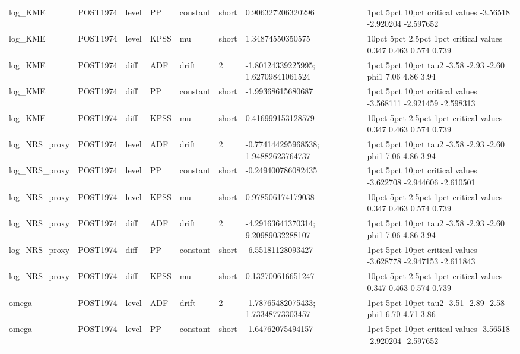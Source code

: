 \begin{tabular}{llllllll}
log\_KME & POST1974 & level & PP & constant & short & 0.906327206320296 &                     1pct      5pct     10pct critical values -3.56518 -2.920204 -2.597652 \\
log\_KME & POST1974 & level & KPSS & mu & short & 1.34874550350575 &                 10pct  5pct 2.5pct  1pct critical values 0.347 0.463  0.574 0.739 \\
log\_KME & POST1974 & diff & ADF & drift & 2 & -1.80124339225995; 1.62709841061524 &       1pct  5pct 10pct tau2 -3.58 -2.93 -2.60 phi1  7.06  4.86  3.94 \\
log\_KME & POST1974 & diff & PP & constant & short & -1.99368615680687 &                      1pct      5pct     10pct critical values -3.568111 -2.921459 -2.598313 \\
log\_KME & POST1974 & diff & KPSS & mu & short & 0.416999153128579 &                 10pct  5pct 2.5pct  1pct critical values 0.347 0.463  0.574 0.739 \\
log\_NRS\_proxy & POST1974 & level & ADF & drift & 2 & -0.774144295968538; 1.94882623764737 &       1pct  5pct 10pct tau2 -3.58 -2.93 -2.60 phi1  7.06  4.86  3.94 \\
log\_NRS\_proxy & POST1974 & level & PP & constant & short & -0.249400786082435 &                      1pct      5pct     10pct critical values -3.622708 -2.944606 -2.610501 \\
log\_NRS\_proxy & POST1974 & level & KPSS & mu & short & 0.978506174179038 &                 10pct  5pct 2.5pct  1pct critical values 0.347 0.463  0.574 0.739 \\
log\_NRS\_proxy & POST1974 & diff & ADF & drift & 2 & -4.29163641370314; 9.20989032288107 &       1pct  5pct 10pct tau2 -3.58 -2.93 -2.60 phi1  7.06  4.86  3.94 \\
log\_NRS\_proxy & POST1974 & diff & PP & constant & short & -6.55181128093427 &                      1pct      5pct     10pct critical values -3.628778 -2.947153 -2.611843 \\
log\_NRS\_proxy & POST1974 & diff & KPSS & mu & short & 0.132700616651247 &                 10pct  5pct 2.5pct  1pct critical values 0.347 0.463  0.574 0.739 \\
omega & POST1974 & level & ADF & drift & 2 & -1.78765482075433; 1.73348773303457 &       1pct  5pct 10pct tau2 -3.51 -2.89 -2.58 phi1  6.70  4.71  3.86 \\
omega & POST1974 & level & PP & constant & short & -1.64762075494157 &                     1pct      5pct     10pct critical values -3.56518 -2.920204 -2.597652 \\

\end{tabular}
